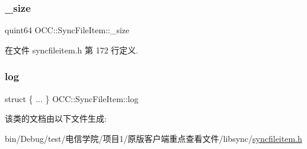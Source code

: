 \subsubsection{\texorpdfstring{\+\_\+size}{\_size}}
{\footnotesize\ttfamily quint64 O\+C\+C\+::\+Sync\+File\+Item\+::\+\_\+size}



在文件 syncfileitem.\+h 第 172 行定义.

\mbox{\label{class_o_c_c_1_1_sync_file_item_a4ce17b41b823e489e5e6bbf651b5f1c2}} 
\subsubsection{\texorpdfstring{log}{log}}
{\footnotesize\ttfamily struct \{ ... \}   O\+C\+C\+::\+Sync\+File\+Item\+::log}



该类的文档由以下文件生成\+:\begin{DoxyCompactItemize}
\item 
bin/\+Debug/test/电信学院/项目1/原版客户端重点查看文件/libsync/\hyperlink{syncfileitem_8h}{syncfileitem.\+h}\end{DoxyCompactItemize}
